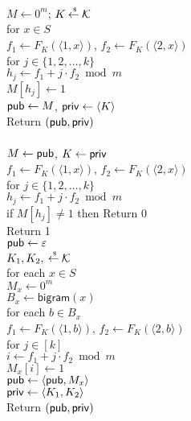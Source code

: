 \begin{figure}[tp]
\centering
{}
{
\\
$M \gets 0^m$; $K {\:\stackrel{{\scriptscriptstyle \hspace{0.2em}\$}} {\leftarrow}\:} {\cal K}$\\
for $x \in S$\\
\nudge $f_1 \gets F_{K}(\langle 1,x \rangle)$, $f_2 \gets F_{K}(\langle 2,x \rangle)$\\
\nudge for $j \in \{1,2,\ldots,k\}$\\
\nudge\nudge $h_j \gets f_1 + j\cdot f_2 \bmod m$\\
\nudge\nudge $M[h_j] \gets 1$\\
${\sf pub} \gets M$, ${\sf priv} \gets \langle K \rangle$\\
Return $({\sf pub},{\sf priv})$\\

\medskip
\algorithmv{$\Qry(\pubaux,\privaux)$}\\
$M\gets{\sf pub}$, $K \gets {\sf priv}$\\
$f_1 \gets F_{K}(\langle 1,x \rangle)$, $f_2 \gets F_{K}(\langle 2,x \rangle)$\\
for $j \in \{1,2,\ldots,k\}$\\
\nudge $h_j \gets f_1 + j\cdot f_2 \bmod m$\\
\nudge if $M[h_j] \neq 1$ then Return 0\\
Return 1
}
{
\\
${\sf pub} \gets \varepsilon$\\
$K_1,K_2, {\:\stackrel{{\scriptscriptstyle \hspace{0.2em}\$}} {\leftarrow}\:} {\cal K}$\\
for each $x \in S$\\
\nudge $M_x \gets 0^m$\\
\nudge $B_x \gets \mathsf{bigram}(x)$\\
\nudge for each $b \in B_x$\\
\nudge\nudge $f_1 \gets F_{K}(\langle 1,b \rangle)$, $f_2 \gets F_{K}(\langle 2,b \rangle)$\\
\nudge\nudge for $j \in [k]$\\
\nudge\nudge\nudge $i \gets f_1+j\cdot f_2 \bmod m$\\
\nudge\nudge\nudge $M_x[i] \gets 1$\\
\nudge ${\sf pub} \gets \langle{\sf pub}, M_x \rangle$\\
${\sf priv} \gets \langle K_1,K_2 \rangle$\\
Return $({\sf pub},{\sf priv})$\\

}
\end{figure}
